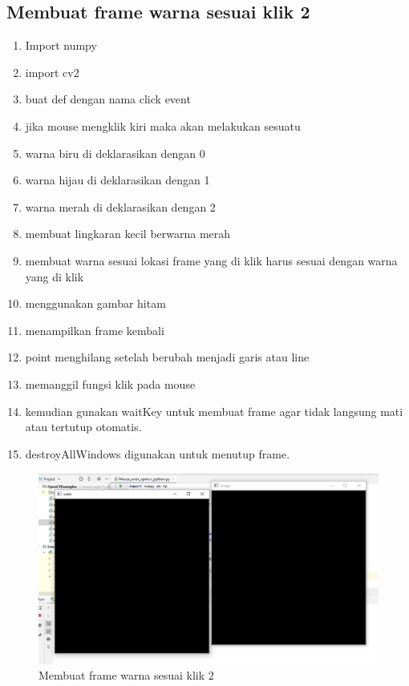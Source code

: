 \newpage
\subsection{Membuat frame warna sesuai klik 2}

\begin{enumerate}
	\item Import numpy
	\item import cv2
	\item buat def dengan nama click event
	\item jika mouse mengklik kiri maka akan melakukan sesuatu
	\item warna biru di deklarasikan dengan 0
	\item warna hijau di deklarasikan dengan 1
	\item warna merah di deklarasikan dengan 2
	\item membuat lingkaran kecil berwarna merah
	\item membuat warna sesuai lokasi frame yang di klik harus sesuai dengan warna yang di klik
	\item menggunakan gambar hitam
	\item menampilkan frame kembali
	\item point menghilang setelah berubah menjadi garis atau line
	\item memanggil fungsi klik pada mouse
	\item kemudian gunakan waitKey untuk membuat frame agar tidak langsung mati atau tertutup otomatis.
	\item destroyAllWindows digunakan untuk menutup frame.
\end{enumerate}

\begin{figure}[ht]
\centering
\includegraphics[scale=0.4]{figures/2,25.jpg}
\caption{Membuat frame warna sesuai klik 2}
\label{contoh}
\end{figure}



